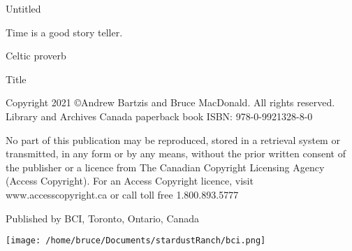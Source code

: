 \documentclass[letterpaper,9pt,twoside,titlepage,onecolumn,openany]{book}
\begin{document}
\newpage{}
\thispagestyle{empty}

\vspace{30mm}

\begin{center}
\huge{Untitled}\\
\large{}
\end{center}

\vspace{10mm}


\newpage




\begin{center}


\end{center}

\vspace{5mm}
\begin{center}

Time is a good story teller.


Celtic proverb

\end{center}

\newpage
\thispagestyle{empty}



\begin{center}



\large{Title}

\end{center}




\vspace{5mm}
\noindent
Copyright 2021  \copyright Andrew Bartzis and Bruce MacDonald. All rights reserved.
Library and Archives Canada paperback book ISBN: 978-0-9921328-8-0


\vspace{5mm}
\noindent
No part of this publication may be reproduced, stored in a retrieval system or transmitted, in any form or by any means, without the prior written consent of the publisher or a licence from The Canadian Copyright Licensing Agency (Access Copyright). For an Access Copyright licence, visit www.accesscopyright.ca or call toll free 1.800.893.5777


\vspace{5mm}
\noindent
Published by BCI, Toronto, Ontario, Canada


\begin{center}


\texttt{[image: /home/bruce/Documents/stardustRanch/bci.png]}

\end{center}
\end{document}
